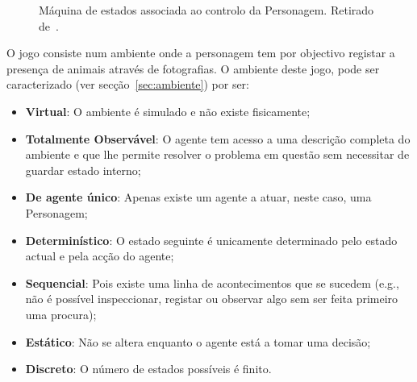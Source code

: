 \begin{figure}[H]
    \begin{center}
    \end{center}
    \caption{Máquina de estados associada ao controlo da Personagem.
    Retirado de~\cite{isel:iasa:slides:intro-eng-soft-parte-3}.}\label{fig:projeto-parte1-maqest-personagem}
\end{figure}

O jogo consiste num ambiente onde a personagem tem por objectivo registar a presença de animais através de fotografias.
O ambiente deste jogo, pode ser caracterizado (ver secção~\ref{sec:ambiente}) por ser:

\begin{itemize}
    \item \textbf{Virtual}: O ambiente é simulado e não existe fisicamente;
    \item \textbf{Totalmente Observável}: O agente tem acesso a uma descrição completa do ambiente e que lhe permite resolver o problema em questão sem necessitar de guardar estado interno;
    \item \textbf{De agente único}: Apenas existe um agente a atuar, neste caso, uma Personagem;
    \item \textbf{Determinístico}: O estado seguinte é unicamente determinado pelo estado actual e pela acção do agente;
    \item \textbf{Sequencial}: Pois existe uma linha de acontecimentos que se sucedem (e.g., não é possível inspeccionar, registar ou observar algo sem ser feita primeiro uma procura);
    \item \textbf{Estático}: Não se altera enquanto o agente está a tomar uma decisão;
    \item \textbf{Discreto}: O número de estados possíveis é finito.
\end{itemize}


